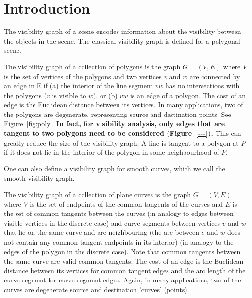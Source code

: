 \documentclass[11pt,twocolumn]{article}
\begin{document}
\section{Introduction}

The visibility graph of a scene encodes information about the visibility 
between the objects in the scene.
The classical visibility graph is defined for a polygonal scene.

\begin{defn2}
The visibility graph of a collection of polygons is the graph $G=(V,E)$ 
where $V$ is the set of vertices of the polygons
and two vertices $v$ and $w$ are connected by an edge in E if 
(a) the interior of the line segment $vw$ has no intersections with the polygons
($v$ is visible to $w$), or (b) $vw$ is an edge of a polygon.
The cost of an edge is the Euclidean distance between its vertices.
In many applications, two of the polygons are degenerate, representing
source and destination points.
See Figure~\ref{fig:poly}.
{\bf In fact, for visibility analysis, only edges that are tangent to two polygons
need to be considered (Figure~\ref{---}).}
This can greatly reduce the size of the visibility graph.
A line is tangent to a polygon at $P$ if it does not lie in the interior 
of the polygon in some neighbourhood of $P$.
\end{defn2}

One can also define a visibility graph for smooth curves,
which we call the smooth visibility graph.

\begin{defn2}
The visibility graph of a collection of plane curves is the graph $G=(V,E)$
where $V$ is the set of endpoints of the common tangents of the curves
and $E$ is the set of common tangents between the curves
(in analogy to edges between visible vertices in the discrete case)
and curve segments between vertices $v$ and $w$ that lie on the same curve
and are neighbouring (the arc between $v$ and $w$ does not contain any
common tangent endpoints in its interior)
(in analogy to the edges of the polygon in the discrete case).
Note that common tangents between the same curve are valid common tangents.
The cost of an edge is the Euclidean distance between its vertices
for common tangent edges and the arc length of the curve segment for
curve segment edges.
Again, in many applications, two of the curves are degenerate source
and destination 'curves' (points).
\end{defn2}
\end{document}
